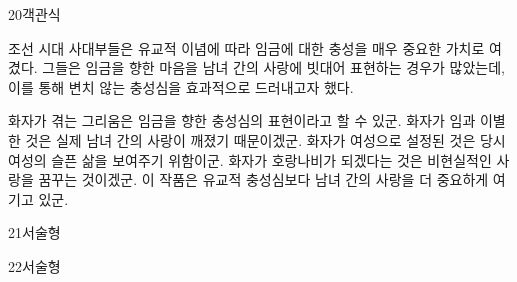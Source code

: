 \documentclass[fs9,seriesRus]{korfarm-base}
\begin{document}
\begin{kfQBlock}{20}{객관식}
\begin{kfEvidence}조선 시대 사대부들은 유교적 이념에 따라 임금에 대한 충성을 매우 중요한 가치로 여겼다. 그들은 임금을 향한 마음을 남녀 간의 사랑에 빗대어 표현하는 경우가 많았는데, 이를 통해 변치 않는 충성심을 효과적으로 드러내고자 했다.\end{kfEvidence}
\begin{kfChoices}
\kfChoice 화자가 겪는 그리움은 임금을 향한 충성심의 표현이라고 할 수 있군.
\kfChoice 화자가 임과 이별한 것은 실제 남녀 간의 사랑이 깨졌기 때문이겠군.
\kfChoice 화자가 여성으로 설정된 것은 당시 여성의 슬픈 삶을 보여주기 위함이군.
\kfChoice 화자가 호랑나비가 되겠다는 것은 비현실적인 사랑을 꿈꾸는 것이겠군.
\kfChoice 이 작품은 유교적 충성심보다 남녀 간의 사랑을 더 중요하게 여기고 있군.
\end{kfChoices}
\end{kfQBlock}
\begin{kfQBlock}{21}{서술형}
\end{kfQBlock}
\begin{kfQBlock}{22}{서술형}
\end{kfQBlock}
\kfEndMC


\end{document}
